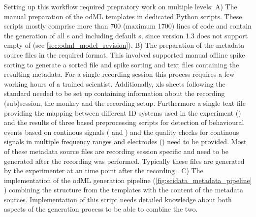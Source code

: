 Setting up this workflow required prepratory work on multiple levels: A) The manual preparation of the odML templates in dedicated Python scripts. These scripts mostly comprise more than 700 (maximum 1700) lines of code and contain the generation of all  s and  including default s, since  version 1.3 does not support empty  of  (see \cref{sec:odml_model_revision}).  B) The preparation of the metadata source files in the required format. This involved  supported manual offline spike sorting to generate a sorted  file and spike sorting  and text files containing the resulting metadata. For a single recording session this process requires a few working hours of a trained scientist. Additionally, xls sheets following the  standard needed to be set up containing information about the recording (sub)session, the monkey and the recording setup. Furthermore a single text file providing the mapping between different ID systems used in the experiment () and the results of three  based preprocessing scripts for detection of behavioural events based on continous signals ( and ) and the quality checks for continous signals in multiple frequency ranges and electrodes () need to be provided. Most of these metadata source files are recording session specific and need to be generated after the recording was performed. Typically these files are generated by the experimenter at an  time point after the recording . C) The implementation of the odML generation pipeline (\cref{fig:scidata_metadata_pipeline} ) combining the  structure from the templates with the content of the metadata sources. Implementation of this script needs detailed knowledge about both aspects of the  generation process to be able to combine the two.


